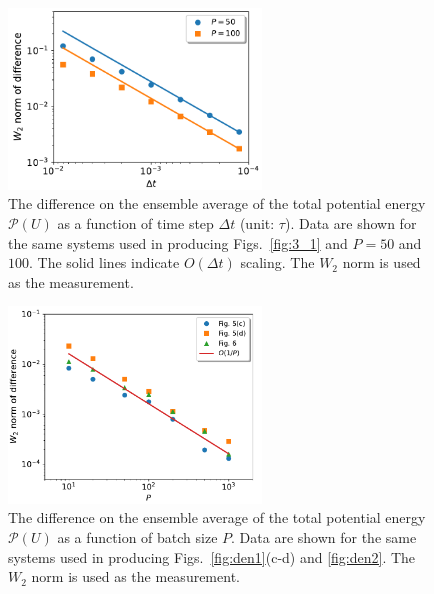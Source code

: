 \begin{figure}[!ht]
\begin{center}
\includegraphics[width=0.6\textwidth]{figs/Energy_3_1.pdf}
\caption{ {The difference on the ensemble average of the total potential energy $\mathscr{P}(U)$ as a function of time step $\Delta t$ (unit: $\tau$). Data are shown for the same systems used in producing Figs.~\ref{fig:3_1} and $P=50$ and $100$. The solid lines indicate $O(\Delta t)$ scaling. The $W_2$ norm is used as the measurement.}}
\label{fig:energy2d_3_1}
\end{center} 
\end{figure}

\begin{figure}[htb]
\begin{center}
\includegraphics[width=0.6\textwidth]{figs/Energy.pdf}
\caption{The difference on the ensemble average of the total potential energy $\mathscr{P}(U)$ as a function of batch size $P$. Data are shown for the same systems used in producing Figs.~\ref{fig:den1}(c-d) and \ref{fig:den2}. The $W_2$ norm is used as the measurement.}
\label{fig:energy2d}
\end{center} 
\end{figure}

